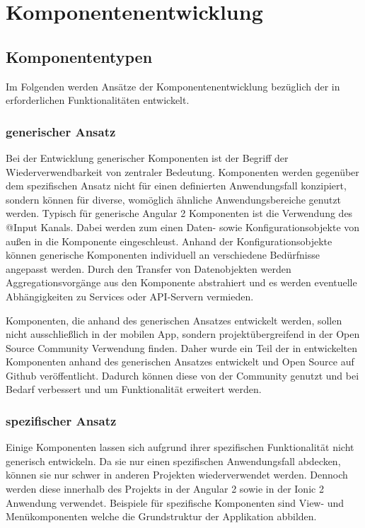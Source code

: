 \section{Komponentenentwicklung}

\subsection{Komponententypen}

Im Folgenden werden Ansätze der Komponentenentwicklung bezüglich der in
\projectname{} erforderlichen Funktionalitäten entwickelt.


\subsubsection{generischer Ansatz}

Bei der Entwicklung generischer Komponenten ist der Begriff der Wiederverwendbarkeit von zentraler Bedeutung.
Komponenten werden gegenüber dem spezifischen Ansatz nicht für einen definierten Anwendungsfall konzipiert,
sondern können
für diverse, womöglich ähnliche Anwendungsbereiche genutzt werden.
Typisch für generische Angular 2 Komponenten ist die Verwendung des @Input Kanals.
Dabei werden zum einen Daten- sowie Konfigurationsobjekte von außen in die Komponente eingeschleust.
Anhand der Konfigurationsobjekte können generische Komponenten individuell an verschiedene Bedürfnisse angepasst werden.
Durch den Transfer von Datenobjekten werden Aggregationsvorgänge aus den Komponente abstrahiert und es werden eventuelle
Abhängigkeiten zu Services oder API-Servern vermieden.

Komponenten,
die anhand des generischen Ansatzes entwickelt werden,
sollen nicht ausschließlich in der mobilen App,
sondern projektübergreifend in der Open Source Community Verwendung finden.
Daher wurde ein Teil der in \projectname{} entwickelten Komponenten anhand des generischen Ansatzes
entwickelt und Open Source auf Github veröffentlicht.
Dadurch können diese von der Community genutzt und bei Bedarf verbessert und um Funktionalität erweitert werden.


\subsubsection{spezifischer Ansatz}

Einige Komponenten lassen sich aufgrund ihrer spezifischen Funktionalität nicht generisch entwickeln.
Da sie nur einen spezifischen Anwendungsfall abdecken, können sie nur schwer in anderen Projekten wiederverwendet werden.
Dennoch werden diese innerhalb des Projekts \projectname{}
in der Angular 2 sowie in der Ionic 2 Anwendung verwendet.
Beispiele für spezifische Komponenten sind View- und Menükomponenten welche die Grundstruktur der Applikation abbilden.

